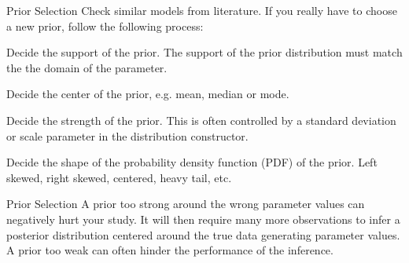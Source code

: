 \begin{frame}{Prior Selection}
  \vfill
  Check similar models from literature. If you really have to choose a new prior, follow the following process:
  \vfill
  \begin{vfilleditems}
	 \item Decide the support of the prior. The support of the prior distribution must match the the domain of the parameter.
	 \item Decide the center of the prior, e.g. mean, median or mode.
	 \item Decide the strength of the prior. This is often controlled by a standard deviation or scale parameter in the distribution constructor.
	 \item Decide the shape of the probability density function (PDF) of the prior. Left skewed, right skewed, centered, heavy tail, etc.
  \end{vfilleditems}
\end{frame}

\begin{frame}{Prior Selection}
  A prior too strong around the wrong parameter values can negatively hurt your study.
  \vfill
  It will then require many more observations to infer a posterior distribution centered around the true data generating parameter values.
  \vfill
  A prior too weak can often hinder the performance of the inference.
\end{frame}


